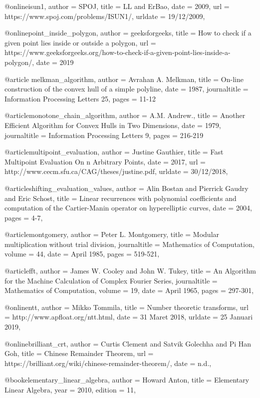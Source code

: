 @online{isun1,
	author = {SPOJ},
	title = {LL and ErBao},
	date = {2009},
	url = {https://www.spoj.com/problems/ISUN1/},
	urldate = {19/12/2009},
}

@online{point_inside_polygon,
	author = {geeksforgeeks},
	title = {How to check if a given point lies inside or outside a polygon},
	url = {https://www.geeksforgeeks.org/how-to-check-if-a-given-point-lies-inside-a-polygon/},
	date = {2019}
}

@article{ melkman_algorithm,
	author = {Avrahan A. Melkman},
	title = {On-line construction of the convex hull of a simple polyline},
	date = {1987},
	journaltitle = {Information Processing Letters 25},
	pages = {11-12}
}

@article{monotone_chain_algorithm,
	author = {A.M. Andrew.},
	title = {Another Efficient Algorithm for Convex Hulls in Two Dimensions},
	date = {1979},
	journaltitle = {Information Processing Letters 9},
	pages = {216-219}
}

@article{multipoint_evaluation,
	author = {Justine Gauthier},
	title = {Fast Multipoint Evaluation On n Arbitrary Points},
	date = {2017},
	url = {http://www.cecm.sfu.ca/CAG/theses/justine.pdf},
	urldate = {30/12/2018},
}

@article{shifting_evaluation_values,
	author = {Alin Bostan and Pierrick Gaudry and Eric Schost},
	title = {Linear recurrences with polynomial coefficients and computation of the Cartier-Manin operator on hyperelliptic curves},
	date = {2004},
	pages = {4-7},
}

@article{montgomery,
	author = {Peter L. Montgomery},
	title = {Modular multiplication without trial division},
	journaltitle = {Mathematics of Computation},
	volume = {44},
	date = {April 1985},
	pages = {519-521},
}

@article{fft,
	author = {James W. Cooley and John W. Tukey},
	title = {An Algorithm for the Machine Calculation of Complex Fourier Series},
	journaltitle = {Mathematics of Computation},
	volume = {19},
	date = {April 1965},
	pages = {297-301},
}

@online{ntt,
	author = {Mikko Tommila},
	title = {Number theoretic transforms},
	url = {http://www.apfloat.org/ntt.html},
	date = {31 Maret 2018},
	urldate = {25 Januari 2019},
}

@online{brilliant_crt,
	author = {Curtis Clement and Satvik Golechha and Pi Han Goh},
	title = {Chinese Remainder Theorem},
	url = {https://brilliant.org/wiki/chinese-remainder-theorem/},
	date = {n.d.},
}

@book{elementary_linear_algebra,
	author = {Howard Anton},
	title = {Elementary Linear Algebra},
	year = {2010},
	edition = {11},
}

